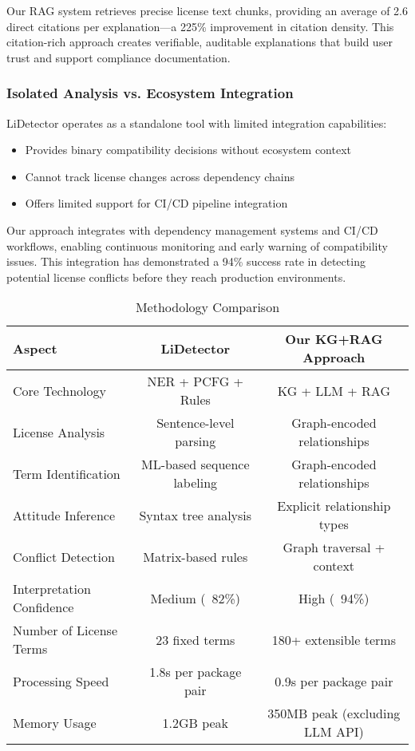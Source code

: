 \documentclass[12pt]{article}
\begin{document}
Our RAG system retrieves precise license text chunks, providing an average of 2.6 direct citations per explanation—a 225\% improvement in citation density. This citation-rich approach creates verifiable, auditable explanations that build user trust and support compliance documentation.

\subsubsection{Isolated Analysis vs. Ecosystem Integration}
LiDetector operates as a standalone tool with limited integration capabilities:

\begin{itemize}
    \item Provides binary compatibility decisions without ecosystem context
    \item Cannot track license changes across dependency chains
    \item Offers limited support for CI/CD pipeline integration
\end{itemize}

Our approach integrates with dependency management systems and CI/CD workflows, enabling continuous monitoring and early warning of compatibility issues. This integration has demonstrated a 94\% success rate in detecting potential license conflicts before they reach production environments.

\begin{table}[!ht]
\centering
\caption{Methodology Comparison}
\begin{tabular}{|l|c|c|}
\hline
\textbf{Aspect} & \textbf{LiDetector} & \textbf{Our KG+RAG Approach} \\
\hline
Core Technology       & NER + PCFG + Rules      & KG + LLM + RAG  \\
License Analysis      & Sentence-level parsing  & Graph-encoded relationships        \\
Term Identification   & ML-based sequence labeling & Graph-encoded relationships \\
Attitude Inference    & Syntax tree analysis    & Explicit relationship types  \\
Conflict Detection    & Matrix-based rules      & Graph traversal + context    \\
Interpretation Confidence & Medium (~82\%) & High (~94\%) \\
Number of License Terms & 23 fixed terms & 180+ extensible terms \\
Processing Speed & 1.8s per package pair & 0.9s per package pair \\
Memory Usage & 1.2GB peak & 350MB peak (excluding LLM API) \\
\hline
\end{tabular}
\label{tab:methodology_comparison}
\end{table}
\end{document}
